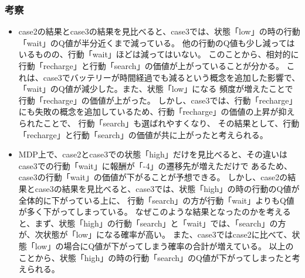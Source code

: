 \subsubsection{考察}
\begin{itemize}
  \item case2の結果とcase3の結果を見比べると、case3では、状態「low」の時の行動「wait」のQ値が半分近くまで減っている。
  他の行動のQ値も少し減ってはいるものの、行動「wait」ほどは減ってはいない。
  このことから、相対的に行動「recharge」と行動「search」の価値が上がっていることが分かる。
  これは、case3でバッテリーが時間経過でも減るという概念を追加した影響で、「wait」のQ値が減少した。また、状態「low」になる
  頻度が増えたことで行動「recharge」の価値が上がった。
  しかし、case3では、行動「recharge」にも失敗の概念を追加しているため、行動「recharge」の価値の上昇が抑えられたことで、
  行動「search」も選ばれやすくなり、
  その結果として、行動「recharge」と行動「search」の価値が共に上がったと考えられる。
  \item MDP上で、case2とcase3での状態「high」だけを見比べると、その違いはcase3での行動「wait」に報酬が「-4」の遷移先が増えただけで
  あるため、case3の行動「wait」の価値が下がることが予想できる。
  しかし、case2の結果とcase3の結果を見比べると、case3では、状態「high」の時の行動のQ値が全体的に下がっている上に、
  行動「search」の方が行動「wait」よりもQ値が多く下がってしまっている。
  なぜこのような結果となったのかを考えると、まず、状態「high」の行動「search」と「wait」では、「search」の方が、次状態が「low」になる確率が高い。
  また、case3ではcase2に比べて、状態「low」の場合にQ値が下がってしまう確率の合計が増えている。
  以上のことから、状態「high」の時の行動「search」のQ値が下がってしまったと考えられる。
\end{itemize}

\clearpage
